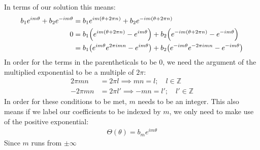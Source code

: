 \documentclass[12pt]{article}
\begin{document}
In terms of our solution this means:
\begin{align*}
  b_1e^{im\theta}+b_2e^{-im\theta}&=
  b_1e^{im(\theta+2\pi n)}+b_2e^{-im(\theta+2\pi n)}\\
  0&=b_1\qty(e^{im(\theta+2\pi n)}-e^{im\theta})
  +b_2\qty(e^{-im(\theta+2\pi n)}-e^{-im\theta})\\
  &=b_1\qty(e^{im\theta}e^{2\pi imn}-e^{im\theta})
  +b_2\qty(e^{-im\theta}e^{-2\pi imn}-e^{-im\theta})
\end{align*}
In order for the terms in the parentheticals to be $0$, we need the argument of the multiplied exponential to be a multiple of $2\pi$:
\begin{align*}
  2\pi mn&=2\pi l\implies m n = l;\quad l\in\mathbb{Z}\\
  -2\pi mn&=2\pi l'\implies -m n = l';\quad l'\in\mathbb{Z}
\end{align*}
In order for these conditions to be met, $m$ needs to be an integer. This also means if we label our coefficients to be indexed by $m$, we only need to make use of the positive exponential:
\begin{align*}
  \Theta(\theta)=b_me^{im\theta}
\end{align*}
Since $m$ runs from $\pm\infty$
\end{document}
